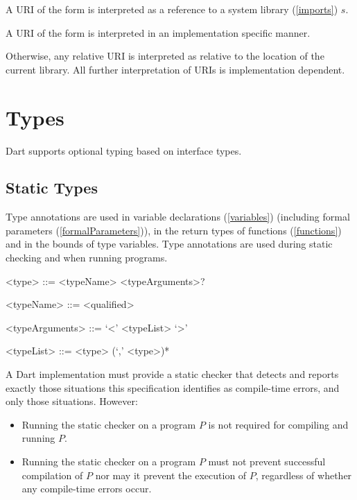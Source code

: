 \documentclass[makeidx]{article}
\begin{document}
{\LMHash{}%
A URI of the form  is interpreted as a reference to a system library (\ref{imports}) $s$.

\LMHash{}%
A URI of the form  is interpreted in an implementation specific manner.


\LMHash{}%
Otherwise, any relative URI is interpreted as relative to the location of the current library.
All further interpretation of URIs is implementation dependent.



\section{Types}

\LMHash{}%
Dart supports optional typing based on interface types.



\subsection{Static Types}

\LMHash{}%
Type annotations are used in variable declarations (\ref{variables}) (including formal parameters (\ref{formalParameters})), in the return types of functions (\ref{functions}) and in the bounds of type variables.
Type annotations are used during static checking and when running programs.

\begin{grammar}
<type> ::= <typeName> <typeArguments>?

<typeName> ::= <qualified>

<typeArguments> ::= `<' <typeList> `>'

<typeList> ::= <type> (`,' <type>)*
\end{grammar}

\LMHash{}%
A Dart implementation must provide a static checker that detects and reports exactly those situations this specification identifies as compile-time errors,
and only those situations.
However:
\begin{itemize}
\item Running the static checker on a program $P$ is not required for compiling and running $P$.
\item Running the static checker on a program $P$ must not prevent successful compilation of $P$ nor may it prevent the execution of $P$, regardless of whether any compile-time errors occur.
\end{itemize}

}
\end{document}
